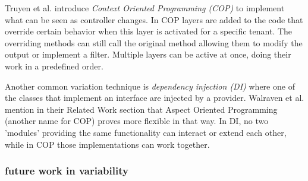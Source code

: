 Truyen et al. \cite{truyen2012context} introduce \textit{Context Oriented Programming (COP)} to implement what can be seen as controller changes. 
In COP layers are added to the code that override certain behavior when this layer is activated for a specific tenant. 
The overriding methods can still call the original method allowing them to modify the output or implement a filter. 
Multiple layers can be active at once, doing their work in a predefined order.

Another common variation technique is \textit{dependency injection (DI)} \cite{walraven2011middleware} where one of the classes that implement an interface are injected by a provider. 
Walraven et al. mention in their Related Work section that Aspect Oriented Programming (another name for COP) proves more flexible in that way. 
In DI, no two 'modules' providing the same functionality can interact or extend each other, while in COP those implementations can work together.

\subsubsection{future work in variability}
